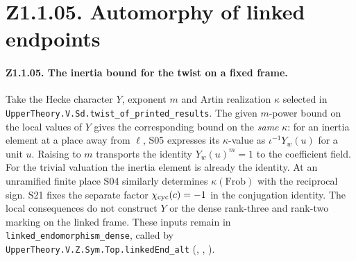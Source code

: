 \section*{Z1.1.05. Automorphy of linked endpoints}

\paragraph{Z1.1.05. The inertia bound for the twist on a fixed frame.}
\label{r8:small:Z1.1.05}
Take the Hecke character \(Y\), exponent \(m\) and Artin realization
\(\kappa\) selected in \nolinkurl{UpperTheory.V.Sd.twist_of_printed_results}.
The given \(m\)-power bound on the local values of \(Y\) gives the
corresponding bound on the \emph{same} \(\kappa\): for an inertia element
at a place away from \(\ell\), S05 expresses its \(\kappa\)-value as
\(\iota^{-1}Y_w(u)\) for a unit \(u\). Raising to \(m\) transports the
identity \(Y_w(u)^m=1\) to the coefficient field. For the trivial valuation
the inertia element is already the identity. At an unramified finite place
S04 similarly determines \(\kappa(\mathrm{Frob})\) with the reciprocal
sign. S21 fixes the separate factor \(\chi_{\rm cyc}(c)=-1\) in the
conjugation identity. The local consequences do not construct \(Y\) or
the dense rank-three and rank-two marking on the linked frame. These
inputs remain in \nolinkurl{linked_endomorphism_dense}, called by
\nolinkurl{UpperTheory.V.Z.Sym.Top.linkedEnd_alt}
(, ,
).

